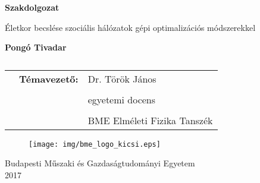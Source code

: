 \documentclass[12pt]{article}
\begin{document}

\begin{titlepage}
	\centering
	{\Huge\bfseries Szakdolgozat\par}
	\vspace{1cm}
	\vspace{1cm}
	{\LARGE Életkor becslése szociális hálózatok gépi optimalizációs módszerekkel\par} %
	\vspace{3cm}
	{\huge\bfseries Pongó Tivadar\\\par}
	\vspace{3cm}
	\begin{table}[H]
		\centering
		\begin{tabular}{ccl}
			&	\LARGE\textbf{Témavezető:} &\Large Dr. Török János \\
			& &\\
			& &\Large egyetemi docens \\
			& &\\
			& &\Large BME Elméleti Fizika Tanszék \\
			
		\end{tabular}
		\caption*{}
		\label{t1}
	\end{table}
	\vfill
	\begin{figure}[H]
		\centering
		\texttt{[image: img/bme\_logo\_kicsi.eps]}
	\end{figure} 
	{\large Budapesti Műszaki és Gazdaságtudományi Egyetem\\ 2017 \par}
\end{titlepage}
\onehalfspacing
\iffalse
\end{document}
